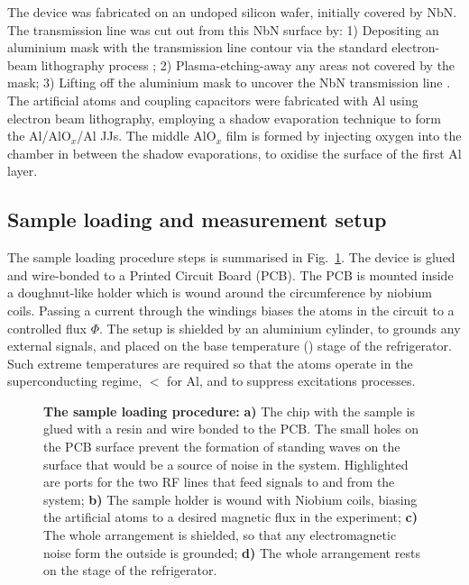  The device was fabricated on an undoped silicon wafer, initially covered by NbN. The transmission line was cut out from this NbN surface by: 1) Depositing an aluminium mask with the transmission line contour via the standard electron-beam lithography process \cite{Electronbeamtechnologyinmicroelectronicfabrication}; 2) Plasma-etching-away any areas not covered by the mask; 3) Lifting off the aluminium mask to uncover the NbN transmission line . The artificial atoms and coupling capacitors were fabricated with Al using electron beam lithography, employing a shadow evaporation technique \cite{Fabrication} to form the Al/AlO$_x$/Al JJs. The middle AlO$ _{x} $ film is formed by injecting oxygen into the chamber in between the shadow evaporations, to oxidise the surface of the first Al layer.
   
 \subsection{Sample loading and measurement setup\label{subsec:Setup}}  
  The sample loading procedure steps is summarised in Fig.~\ref{loadingLoad}. The device is glued and wire-bonded to a Printed Circuit Board (PCB). The PCB is mounted inside a doughnut-like holder which is wound around the circumference by niobium coils. Passing a current through the windings biases the atoms in the circuit to a controlled flux $ \Phi $. The setup is shielded by an aluminium cylinder, to grounds any external signals, and placed on the base temperature () stage of the refrigerator. Such extreme temperatures are required so that the atoms operate in the superconducting regime, $ < $ for Al, and to suppress excitations processes.
    
  \begin{figure}
  	\caption{\small\textbf{The sample loading procedure:} \textbf{a)} The chip with the sample is glued with a resin and wire bonded to the PCB. The small holes on the PCB surface prevent the formation of standing waves on the surface that would be a source of noise in the system. Highlighted are ports for the two RF lines that feed signals to and from the system; \textbf{b)} The sample holder is wound with Niobium coils, biasing the artificial atoms to a desired magnetic flux in the experiment; \textbf{c)} The whole arrangement is shielded, so that any electromagnetic noise form the outside is grounded; \textbf{d)} The whole arrangement rests on the  stage of the refrigerator.}
  	\label{loadingLoad}
  \end{figure}
 
